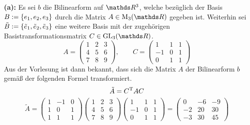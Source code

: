 			\textbf{(a):}
			Es sei $b$ die Bilinearform auf $\SR^3$, welche bezüglich der Basis $B:=\left\{ e_1,e_2,e_3 \right\}$ durch die Matrix $A\in\m{M}_3(\SR)$ gegeben ist.
			Weiterhin sei $\tilde{B}:=\left\{ \tilde{e}_1, \tilde{e}_2, \tilde{e}_3 \right\}$ eine weitere Basis mit der zugehörigen Basistransformationsmatrix $C\in\m{GL}_3(\SR)$.
			\[
				A =
				\begin{pmatrix}
					1 & 2 & 3 \\
					4 & 5 & 6 \\
					7 & 8 & 9
				\end{pmatrix},\qquad
				C =
				\begin{pmatrix}
					1 & 1 & 1 \\
					-1 & 0 & 1 \\
					0 & 1 & 1
				\end{pmatrix}
			\]
			Aus der Vorlesung ist dann bekannt, dass sich die Matrix $A$ der Bilinearform $b$ gemäß der folgenden Formel transformiert.
			\[ \tilde{A} = C^{\mathrm{T}} A C \]
			\[
				\tilde{A} =
				\begin{pmatrix}
					1 & -1 & 0 \\
					1 & 0 & 1 \\
					1 & 1 & 1
				\end{pmatrix}
				\begin{pmatrix}
					1 & 2 & 3 \\
					4 & 5 & 6 \\
					7 & 8 & 9
				\end{pmatrix}
				\begin{pmatrix}
					1 & 1 & 1 \\
					-1 & 0 & 1 \\
					0 & 1 & 1
				\end{pmatrix}
				=
				\begin{pmatrix}
					0 & -6 & -9 \\
					-2 & 20 & 30 \\
					-3 & 30 & 45
				\end{pmatrix}
			\]

